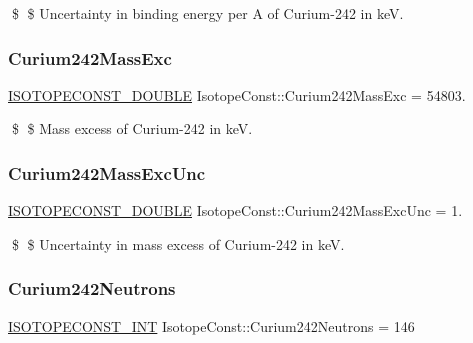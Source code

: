 \$ \$ Uncertainty in binding energy per A of Curium-\/242 in keV. \mbox{\label{group___isotope_const-_curium-_cm242_gaa50639efb8b02db9afeca566d6383153}} 
\subsubsection{\texorpdfstring{Curium242\+Mass\+Exc}{Curium242MassExc}}
{\footnotesize\ttfamily \mbox{\hyperlink{group___isotope_const-_macros_ga8f45a7272ce02c0b4c65c44636ed719a}{I\+S\+O\+T\+O\+P\+E\+C\+O\+N\+S\+T\+\_\+\+D\+O\+U\+B\+LE}} Isotope\+Const\+::\+Curium242\+Mass\+Exc = 54803.}

\$ \$ Mass excess of Curium-\/242 in keV. \mbox{\label{group___isotope_const-_curium-_cm242_ga82d0027b2f4f6ab7704f4a45df6e7d96}} 
\subsubsection{\texorpdfstring{Curium242\+Mass\+Exc\+Unc}{Curium242MassExcUnc}}
{\footnotesize\ttfamily \mbox{\hyperlink{group___isotope_const-_macros_ga8f45a7272ce02c0b4c65c44636ed719a}{I\+S\+O\+T\+O\+P\+E\+C\+O\+N\+S\+T\+\_\+\+D\+O\+U\+B\+LE}} Isotope\+Const\+::\+Curium242\+Mass\+Exc\+Unc = 1.}

\$ \$ Uncertainty in mass excess of Curium-\/242 in keV. \mbox{\label{group___isotope_const-_curium-_cm242_ga0febb8e93dffbef5273b5d922b48bf39}} 
\subsubsection{\texorpdfstring{Curium242\+Neutrons}{Curium242Neutrons}}
{\footnotesize\ttfamily \mbox{\hyperlink{group___isotope_const-_macros_ga5f18360b3e99483a35c32d789e62621c}{I\+S\+O\+T\+O\+P\+E\+C\+O\+N\+S\+T\+\_\+\+I\+NT}} Isotope\+Const\+::\+Curium242\+Neutrons = 146}

